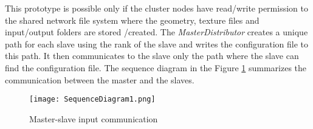


This prototype is possible only if the cluster nodes have read/write permission to the shared network file system where the geometry, texture files and input/output folders are stored /created. The \textit{MasterDistributor} creates a unique path for each slave using the rank of the slave and writes the configuration file to this path. It then communicates to the slave only the path where the slave can find the configuration file. The sequence diagram in the Figure \ref{fig:SequenceDiagram1} summarizes the communication between the master and the slaves.  

\begin{figure}[ht!]
\centering
\texttt{[image: SequenceDiagram1.png]}
\caption{Master-slave input communication}
\label{fig:SequenceDiagram1}
\end{figure}

